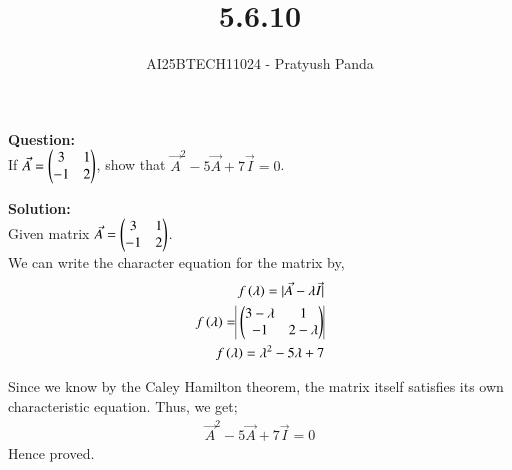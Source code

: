 \documentclass[journal]{IEEEtran}
\begin{document}

\vspace{3cm}

\title{5.6.10}
\author{AI25BTECH11024 - Pratyush Panda
}
\maketitle
{\let\newpage\relax\maketitle}

\renewcommand{\thefigure}{\theenumi}
\renewcommand{\thetable}{\theenumi}
\setlength{\intextsep}{10pt} %


\renewcommand{\thetable}{\theenumi}

\textbf{Question: } \\
If $\Vec{A}=\begin{pmatrix}3 & 1 \\ -1 & 2\end{pmatrix}$, show that $\Vec{A}^2-5\Vec{A}+7\Vec{I}=0$.
\vspace{0.7cm}

\textbf{Solution: } \\
Given matrix $\Vec{A}=\begin{pmatrix}3 & 1 \\ -1 & 2\end{pmatrix}$.\\

We can write the character equation for the matrix by,
\begin{align}
f\brak{\lambda}=|\Vec{A}-\lambda\Vec{I}| \\
f\brak{\lambda}=\vline\myvec{3-\lambda & 1 \\ -1 & 2-\lambda}\vline\\
f\brak{\lambda}=\lambda^2-5\lambda+7
\end{align}

Since we know by the Caley Hamilton theorem, the matrix itself satisfies its own characteristic equation. Thus, we get;
\begin{align}
\Vec{A}^2-5\Vec{A}+7\Vec{I}=0
\end{align}
Hence proved.
\end{document}
